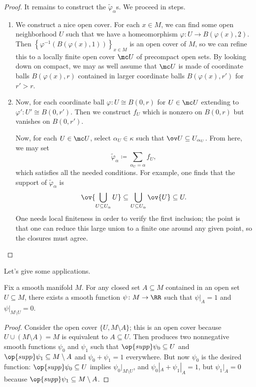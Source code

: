 \documentclass[../notes.tex]{subfiles}
\begin{document}
\begin{proof}
	It remains to construct the $\widetilde\varphi_\alpha$s. We proceed in steps.
	\begin{enumerate}
		\item We construct a nice open cover. For each $x\in M$, we can find some open neighborhood $U$ such that we have a homeomorphism $\varphi\colon U\to B(\varphi(x),2)$. Then $\left\{\varphi^{-1}(B(\varphi(x),1))\right\}_{x\in M}$ is an open cover of $M$, so we can refine this to a locally finite open cover $\mc U$ of precompact open sets. By looking down on compact, we may as well assume that $\mc U$ is made of coordinate balls $B(\varphi(x),r)$ contained in larger coordinate balls $B(\varphi(x),r')$ for $r'>r$.
		\item Now, for each coordinate ball $\varphi\colon U\cong B(0,r)$ for $U\in\mc U$ extending to $\varphi'\colon U'\cong B(0,r')$. Then we construct $f_U$ which is nonzero on $B(0,r)$ but vanishes on $B(0,r')$.

		Now, for each $U\in\mc U$, select $\alpha_U\in\kappa$ such that $\ov U\subseteq U_{\alpha_U}$. From here, we may set
		\[\widetilde\varphi_\alpha\coloneqq\sum_{\alpha_U=\alpha}f_U,\]
		which satisfies all the needed conditions. For example, one finds that the support of $\widetilde\varphi_\alpha$ is
		\[\ov{\bigcup_{U\subseteq U_\alpha}U}\subseteq\bigcup_{U\subseteq U_\alpha}\ov{U}\subseteq U.\]
		One needs local finiteness in order to verify the first inclusion; the point is that one can reduce this large union to a finite one around any given point, so the closures must agree.
		\qedhere
	\end{enumerate}
\end{proof}
Let's give some applications.
\begin{corollary} \label{cor:bump}
	Fix a smooth manifold $M$. For any closed set $A\subseteq M$ contained in an open set $U\subseteq M$, there exists a smooth function $\psi\colon M\to\RR$ such that $\psi|_A=1$ and $\psi|_{M\setminus U}=0$.
\end{corollary}
\begin{proof}
	Consider the open cover $\{U,M\setminus A\}$; this is an open cover because $U\cup(M\setminus A)=M$ is equivalent to $A\subseteq U$. Then  produces two nonnegative smooth functions $\psi_0$ and $\psi_1$ such that $\op{supp}\psi_0\subseteq U$ and $\op{supp}\psi_1\subseteq M\setminus A$ and $\psi_0+\psi_1=1$ everywhere. But now $\psi_0$ is the desired function: $\op{supp}\psi_0\subseteq U$ implies $\psi_0|_{M\setminus U}$, and $\psi_0|_A+\psi_1|_A=1$, but $\psi_1|_A=0$ because $\op{supp}\psi_1\subseteq M\setminus A$.
\end{proof}
\end{document}

